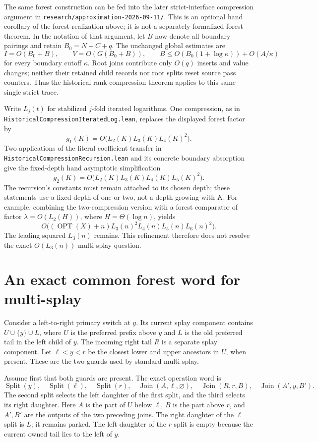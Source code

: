 \documentclass[11pt]{article}
\newcommand{\OPT}{\operatorname{OPT}}
\begin{document}
The same forest construction can be fed into the later strict-interface
compression argument in
\texttt{research/approximation-2026-09-11/}.
This is an optional hand corollary of the forest realization above;
it is not a separately formalized forest theorem. In the notation of
that argument, let $B$ now denote all boundary pairings and retain
$B_0=N+C+q$. The unchanged global estimates are
\[
 I=O(B_0+B),\qquad V=O(G(B_0+B)),\qquad
 B\le O(B_0(1+\log\kappa))+O(A/\kappa)
\]
for every boundary cutoff $\kappa$. Root joins contribute only $O(q)$
inserts and value changes; neither their retained child records nor
root splits reset source pass counters. Thus the historical-rank
compression theorem applies to this same single strict trace.

Write $L_j(t)$ for stabilized $j$-fold iterated logarithms. One
compression, as in \texttt{HistoricalCompressionIteratedLog.lean},
replaces the displayed forest factor by
\[
 g_1(K)=O\bigl(L_2(K)L_3(K)L_4(K)^2\bigr).
\]
Two applications of the literal coefficient transfer in
\texttt{HistoricalCompressionRecursion.lean} and its concrete boundary
absorption give the fixed-depth hand asymptotic simplification
\[
 g_2(K)=O\bigl(L_2(K)L_3(K)L_4(K)L_5(K)^2\bigr).
\]
The recursion's constants must remain attached to its chosen depth;
these statements use a fixed depth of one or two, not a depth growing
with $K$. For example, combining the two-compression version with a
forest comparator of factor $\lambda=O(L_2(H))$, where
$H=\Theta(\log n)$, yields
\[
 O\bigl((\OPT(X)+n)L_3(n)^2L_4(n)L_5(n)L_6(n)^2\bigr).
\]
The leading squared $L_3(n)$ remains. This refinement therefore does
not resolve the exact $O(L_3(n))$ multi-splay question.

\section{An exact common forest word for multi-splay}

Consider a left-to-right primary switch at $y$. Its current splay
component contains $U\cup\{y\}\cup L$, where $U$ is the preferred
prefix above $y$ and $L$ is the old preferred tail in the left child of
$y$. The incoming right tail $R$ is a separate splay component. Let
$\ell<y<r$ be the closest lower and upper ancestors in $U$, when
present. These are the two guards used by standard multi-splay.

Assume first that both guards are present. The exact operation word is
\[
 \operatorname{Split}(y),\quad
 \operatorname{Split}(\ell),\quad
 \operatorname{Split}(r),\quad
 \operatorname{Join}(A,\ell,\varnothing),\quad
 \operatorname{Join}(R,r,B),\quad
 \operatorname{Join}(A',y,B').
\]
The second split selects the left daughter of the first split, and the
third selects its right daughter. Here $A$ is the part of $U$ below
$\ell$, $B$ is the part above $r$, and $A',B'$ are the outputs of the
two preceding joins. The right daughter of the $\ell$ split is $L$;
it remains parked. The left daughter of the $r$ split is empty because
the current owned tail lies to the left of $y$.
\end{document}

